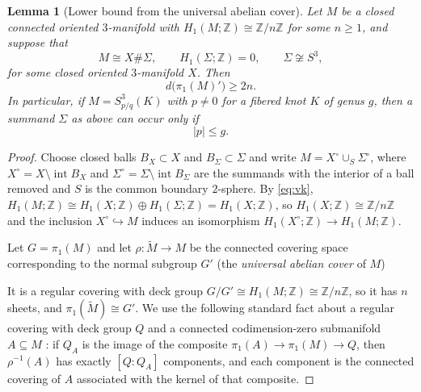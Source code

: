 \documentclass[11pt]{article}
\newcommand{\Z}{\mathbb Z}
\newcommand{\Surg}[2]{S^3_{#1}(#2)}
\newcommand{\Int}{\operatorname{int}}
\newcommand{\rk}{d}
\newtheorem{lemma}[theorem]{Lemma}
\theoremstyle{definition}
\theoremstyle{remark}
\begin{document}
\begin{lemma}[Lower bound from the universal abelian cover]\label{lem:cover}
Let \(M\) be a closed connected oriented \(3\)-manifold with
\(H_1(M;\Z)\cong\Z/n\Z\) for some \(n\geq1\), and suppose that
\[
 M\cong X\#\Sigma,
 \qquad H_1(\Sigma;\Z)=0,\qquad \Sigma\not\cong S^3,
\]
for some closed oriented \(3\)-manifold \(X\). Then
\[
 \rk\bigl(\pi_1(M)'\bigr)\geq 2n.
\]
In particular, if \(M=\Surg{p/q}{K}\) with \(p\neq0\) for a fibered knot
\(K\) of genus \(g\), then a summand \(\Sigma\) as above can occur only if
\begin{equation}\label{eq:numerator}
 |p|\leq g.
\end{equation}
\end{lemma}

\begin{proof}
Choose closed balls \(B_X\subset X\) and \(B_\Sigma\subset\Sigma\) and
write \(M=X^\circ\cup_S\Sigma^\circ\), where
\(X^\circ=X\setminus\Int B_X\) and \(\Sigma^\circ=\Sigma\setminus\Int B_\Sigma\)
are the summands with the interior of a ball removed and \(S\) is the
common boundary \(2\)-sphere. By \eqref{eq:vk},
\(H_1(M;\Z)\cong H_1(X;\Z)\oplus H_1(\Sigma;\Z)=H_1(X;\Z)\), so
\(H_1(X;\Z)\cong\Z/n\Z\) and the inclusion \(X^\circ\hookrightarrow M\)
induces an isomorphism \(H_1(X^\circ;\Z)\to H_1(M;\Z)\).

Let \(G=\pi_1(M)\) and let \(\rho\colon\widetilde M\to M\) be the
connected covering space corresponding to the normal subgroup \(G'\)
(the \emph{universal abelian cover} of \(M\))

It is a regular covering
with deck group \(G/G'\cong H_1(M;\Z)\cong\Z/n\Z\),
so it has \(n\) sheets, and \(\pi_1(\widetilde M)\cong G'\). We use the
following standard fact about a regular covering with deck group \(Q\)
and a connected codimension-zero submanifold \(A\subseteq M\)
\cite[\S1.3]{HatcherAT}: if \(Q_A\) is the image of the composite
\(\pi_1(A)\to\pi_1(M)\to Q\), then \(\rho^{-1}(A)\) has exactly
\([Q:Q_A]\) components, and each component is the connected covering of
\(A\) associated with the kernel of that composite.


\end{proof}
\end{document}
